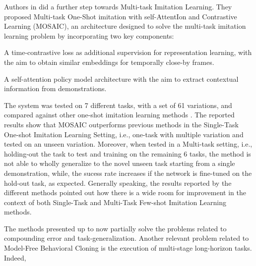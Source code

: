 Authors in \cite{mandi2022towards_more_generalizable_one_shot} did a further step towards Multi-task Imitation Learning. They proposed Multi-task One-Shot imitation with self-AttentIon and Contrastive Learning (MOSAIC), an architecture designed to solve the multi-task imitation learning problem by incorporating two key components: \begin{enumerate*}[label=\textbf{(\arabic*)}]
    \item A time-contrastive loss as additional supervision for representation learning, with the aim to obtain similar embeddings for temporally close-by frames.
    \item A self-attention policy model architecture with the aim to extract contextual information from demonstrations.
\end{enumerate*} The system was tested on 7 different tasks, with a set of 61 variations, and compared against other one-shot imitation learning methods \cite{yu2018daml,dasari2021transformers_one_shot}. The reported results show that MOSAIC outperforms previous methods in the Single-Task One-shot Imitation Learning Setting, i.e., one-task with multiple variation and tested on an unseen variation. Moreover, when tested in a Multi-task setting, i.e., holding-out the task to test and training on the remaining 6 tasks, the method is not able to wholly generalize to the novel unseen task starting from a single demonstration, while, the sucess rate increases if the network is fine-tuned on the hold-out task, as expected. Generally speaking, the results reported by the different methods pointed out how there is a wide room for improvement in the context of both Single-Task and Multi-Task Few-shot Imitation Learning methods. 
% 

The methods presented up to now partially solve the problems related to compounding error and task-generalization. Another relevant problem related to Model-Free Behavioral Cloning is the execution of multi-stage long-horizon tasks. Indeed,   

